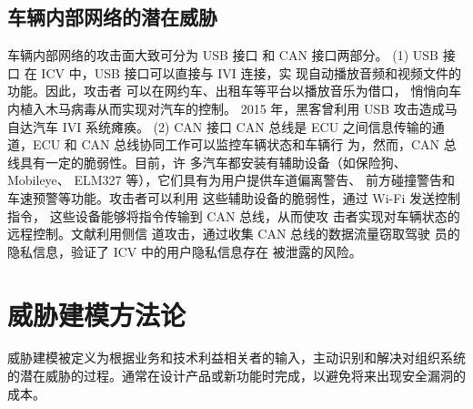 \subsection{车辆内部网络的潜在威胁}
车辆内部网络的攻击面大致可分为 USB 接口
和 CAN 接口两部分。
\newline
(1) USB 接口
在 ICV 中，USB 接口可以直接与 IVI 连接，实
现自动播放音频和视频文件的功能。因此，攻击者
可以在网约车、出租车等平台以播放音乐为借口，
悄悄向车内植入木马病毒从而实现对汽车的控制。
2015 年，黑客曾利用 USB 攻击造成马自达汽车 IVI
系统瘫痪。
\newline
(2) CAN 接口
CAN 总线是 ECU 之间信息传输的通道，ECU
和 CAN 总线协同工作可以监控车辆状态和车辆行
为，然而，CAN 总线具有一定的脆弱性。目前，许
多汽车都安装有辅助设备（如保险狗、Mobileye、
ELM327 等），它们具有为用户提供车道偏离警告、
前方碰撞警告和车速预警等功能。攻击者可以利用
这些辅助设备的脆弱性，通过 Wi-Fi 发送控制指令，
这些设备能够将指令传输到 CAN 总线，从而使攻
击者实现对车辆状态的远程控制。文献\cite{koscher2010experimental}利用侧信
道攻击，通过收集 CAN 总线的数据流量窃取驾驶
员的隐私信息，验证了 ICV 中的用户隐私信息存在
被泄露的风险。

\section{威胁建模方法论}
威胁建模被定义为根据业务和技术利益相关者的输入，主动识别和解决对组织系统的潜在威胁的过程。通常在设计产品或新功能时完成，以避免将来出现安全漏洞的成本。

